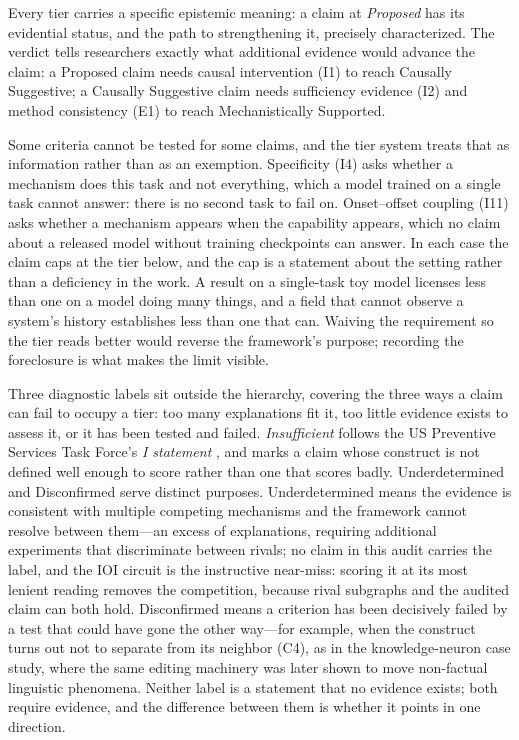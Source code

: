 \documentclass{article}
\begin{document}
Every tier carries a specific epistemic meaning: a claim at \emph{Proposed} has its evidential status, and the path to strengthening it, precisely characterized. The verdict tells researchers exactly what additional evidence would advance the claim: a Proposed claim needs causal intervention (I1) to reach Causally Suggestive; a Causally Suggestive claim needs sufficiency evidence (I2) and method consistency (E1) to reach Mechanistically Supported.

Some criteria cannot be tested for some claims, and the tier system treats that as information rather than as an exemption. Specificity (I4) asks whether a mechanism does this task and not everything, which a model trained on a single task cannot answer: there is no second task to fail on. Onset--offset coupling (I11) asks whether a mechanism appears when the capability appears, which no claim about a released model without training checkpoints can answer. In each case the claim caps at the tier below, and the cap is a statement about the setting rather than a deficiency in the work. A result on a single-task toy model licenses less than one on a model doing many things, and a field that cannot observe a system's history establishes less than one that can. Waiving the requirement so the tier reads better would reverse the framework's purpose; recording the foreclosure is what makes the limit visible.

Three diagnostic labels sit outside the hierarchy, covering the three ways a claim can fail to occupy a tier: too many explanations fit it, too little evidence exists to assess it, or it has been tested and failed. \emph{Insufficient} follows the US Preventive Services Task Force's \emph{I statement} \citep{uspstf2021}, and marks a claim whose construct is not defined well enough to score rather than one that scores badly. Underdetermined and Disconfirmed serve distinct purposes. Underdetermined means the evidence is consistent with multiple competing mechanisms and the framework cannot resolve between them---an excess of explanations, requiring additional experiments that discriminate between rivals; no claim in this audit carries the label, and the IOI circuit is the instructive near-miss: scoring it at its most lenient reading removes the competition, because rival subgraphs and the audited claim can both hold. Disconfirmed means a criterion has been decisively failed by a test that could have gone the other way---for example, when the construct turns out not to separate from its neighbor (C4), as in the knowledge-neuron case study, where the same editing machinery was later shown to move non-factual linguistic phenomena. Neither label is a statement that no evidence exists; both require evidence, and the difference between them is whether it points in one direction.
\end{document}
